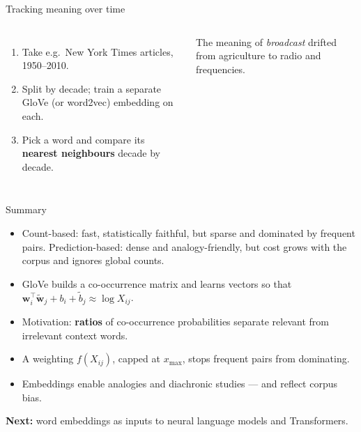 \documentclass[aspectratio=169,11pt]{beamer}
\newcommand{\wv}{\mathbf{w}}
\newcommand{\cv}{\tilde{\mathbf{w}}}
\begin{document}
\begin{frame}{Tracking meaning over time}
\begin{columns}[c]
\begin{enumerate}
  \item Take e.g.\ New York Times articles, 1950--2010.
  \item Split by decade; train a separate GloVe (or word2vec) embedding on
        each.
  \item Pick a word and compare its \textbf{nearest neighbours} decade by
        decade.
\end{enumerate}
\centering
{}
\vspace{2mm}

\small The meaning of \emph{broadcast} drifted from agriculture to radio
and frequencies.
\end{columns}
\end{frame}

\begin{frame}{Summary}
\begin{itemize}
  \item Count-based: fast, statistically faithful, but sparse and dominated
        by frequent pairs. Prediction-based: dense and analogy-friendly, but
        cost grows with the corpus and ignores global counts.
  \item GloVe builds a co-occurrence matrix and learns vectors so that
        $\wv_i^\top\cv_j + b_i + \tilde b_j \approx \log X_{ij}$.
  \item Motivation: \textbf{ratios} of co-occurrence probabilities separate
        relevant from irrelevant context words.
  \item A weighting $f(X_{ij})$, capped at $x_{\max}$, stops frequent pairs
        from dominating.
  \item Embeddings enable analogies and diachronic studies --- and reflect
        corpus bias.
\end{itemize}
\vspace{2mm}
\textbf{Next:} word embeddings as inputs to neural language models and
Transformers.
\end{frame}
\end{document}
